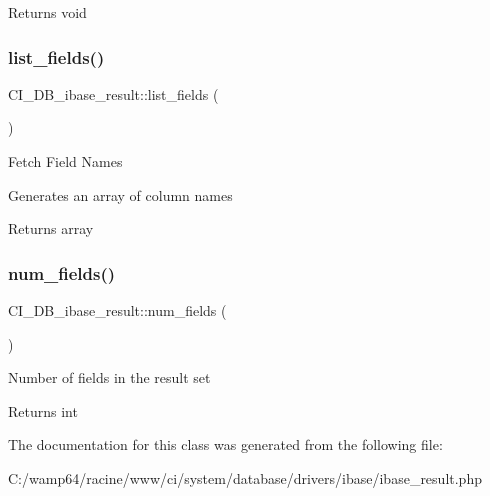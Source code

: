 \begin{DoxyReturn}{Returns}
void 
\end{DoxyReturn}
\mbox{\label{class_c_i___d_b__ibase__result_ace2fc9e167af51df078023f9ff8bb62d}} 
\subsubsection{\texorpdfstring{list\+\_\+fields()}{list\_fields()}}
{\footnotesize\ttfamily C\+I\+\_\+\+D\+B\+\_\+ibase\+\_\+result\+::list\+\_\+fields (\begin{DoxyParamCaption}{ }\end{DoxyParamCaption})}

Fetch Field Names

Generates an array of column names

\begin{DoxyReturn}{Returns}
array 
\end{DoxyReturn}
\mbox{\label{class_c_i___d_b__ibase__result_a8d66562f20c26f68eb73cb5ba7a987b6}} 
\subsubsection{\texorpdfstring{num\+\_\+fields()}{num\_fields()}}
{\footnotesize\ttfamily C\+I\+\_\+\+D\+B\+\_\+ibase\+\_\+result\+::num\+\_\+fields (\begin{DoxyParamCaption}{ }\end{DoxyParamCaption})}

Number of fields in the result set

\begin{DoxyReturn}{Returns}
int 
\end{DoxyReturn}


The documentation for this class was generated from the following file\+:\begin{DoxyCompactItemize}
\item 
C\+:/wamp64/racine/www/ci/system/database/drivers/ibase/ibase\+\_\+result.\+php\end{DoxyCompactItemize}
